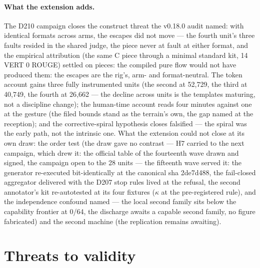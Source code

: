 \documentclass[10pt,a4paper]{article}
\begin{document}
\paragraph{What the extension adds.} The D210 campaign closes the
construct threat the v0.18.0 audit named: with identical formats
across arms, the escapes did not move --- the fourth unit's three
faults resided in the shared judge, the piece never at fault at either
format, and the empirical attribution (the same C piece through a
minimal standard kit, 14 VERT 0 ROUGE) settled on pieces: the
compiled pure flow would not have produced them: the escapes are the
rig's, arm- and format-neutral. The token account gains three fully
instrumented units (the second at 52{,}729, the third at 40{,}749,
the fourth at 26{,}662 --- the decline across units is the templates
maturing, not a discipline change); the human-time account reads
four minutes against one at the gesture (the filed bounds stand as
the terrain's own, the gap named at the reception); and the
corrective-spiral hypothesis closes falsified --- the spiral was the
early path, not the intrinsic one. What the extension could not
close at its own draw: the order test (the draw gave no contrast ---
H7 carried to the next campaign, which drew it: the official table of
the fourteenth wave drawn and signed, the campaign open to the 28
units --- the fifteenth wave served it: the generator re-executed
bit-identically at the canonical sha 2de7d488, the fail-closed
aggregator delivered with the D207 stop rules lived at the refusal,
the second annotator's kit re-autotested at its four fixtures
($\kappa$ at the pre-registered rule), and the independence
confound named --- the local second family sits below the capability
frontier at 0/64, the discharge awaits a capable second family, no
figure fabricated) and the second machine (the replication remains
awaiting).

\section{Threats to validity}\label{sec:threats}
\end{document}
